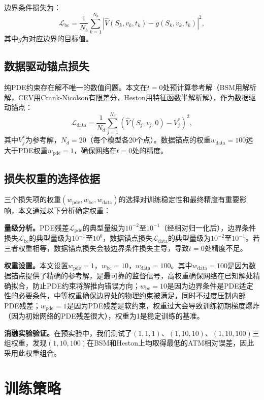 边界条件损失为：
\begin{equation}
  \mathcal{L}_\text{bc} = \frac{1}{N_b}\sum_{k=1}^{N_b}
    \left|\hat{V}(S_k,v_k,t_k) - g(S_k,v_k,t_k)\right|^2,
\end{equation}
其中$g$为对应边界的目标值。

\subsection{数据驱动锚点损失}

纯PDE约束存在解不唯一的数值问题。本文在$t=0$处预计算参考解（BSM用解析解，CEV用Crank-Nicolson有限差分，Heston用特征函数半解析解），作为数据驱动锚点：
\begin{equation}
  \mathcal{L}_\text{data} = \frac{1}{N_d}\sum_{j=1}^{N_d}
    \left(\hat{V}(S_j,v_j,0) - V_j^*\right)^2,
\end{equation}
其中$V_j^*$为参考解，$N_d=20$（每个模型各20个点）。数据锚点的权重$w_\text{data}=100$远大于PDE权重$w_\text{pde}=1$，确保网络在$t=0$处的精度。

\subsection{损失权重的选择依据}

三个损失项的权重$(w_\text{pde}, w_\text{bc}, w_\text{data})$的选择对训练稳定性和最终精度有重要影响，本文通过以下分析确定权重：

\textbf{量级分析。}PDE残差$\mathcal{L}_\text{pde}$的典型量级为$10^{-2}$至$10^{-1}$（经相对归一化后），边界条件损失$\mathcal{L}_\text{bc}$的典型量级为$10^{-1}$至$10^0$，数据锚点损失$\mathcal{L}_\text{data}$的典型量级为$10^{-2}$至$10^{-1}$。若三者权重相等，数据锚点损失会被边界条件损失主导，导致$t=0$处精度不足。

\textbf{权重设置。}本文设置$w_\text{pde}=1$，$w_\text{bc}=10$，$w_\text{data}=100$。其中$w_\text{data}=100$是因为数据锚点提供了精确的参考解，是最可靠的监督信号，高权重确保网络在已知解处精确拟合，防止PDE约束将解推向错误方向；$w_\text{bc}=10$是因为边界条件是PDE适定性的必要条件，中等权重确保边界处的物理约束被满足，同时不过度压制内部PDE残差；$w_\text{pde}=1$是因为PDE残差是软约束，权重过大会导致训练初期梯度爆炸（因为初始网络的PDE残差很大），权重为1是稳定训练的基准。

\textbf{消融实验验证。}在预实验中，我们测试了$(1,1,1)$、$(1,10,10)$、$(1,10,100)$三组权重，发现$(1,10,100)$在BSM和Heston上均取得最低的ATM相对误差，因此采用此权重组合。

\section{训练策略}\label{sec:training}

